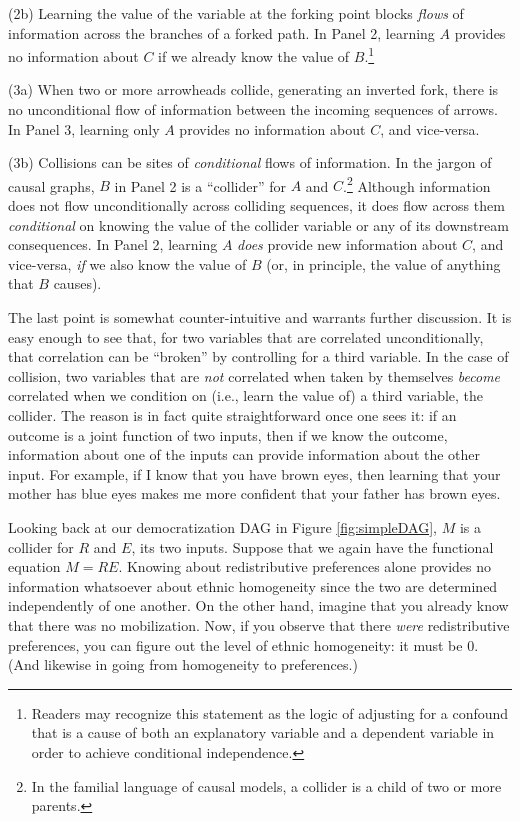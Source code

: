 \documentclass[
  12pt,
]{book}
\begin{document}
(2b) Learning the value of the variable at the forking point blocks \emph{flows} of information across the branches of a forked path. In Panel 2, learning \(A\) provides no information about \(C\) if we already know the value of \(B\).\footnote{Readers may recognize this statement as the logic of adjusting for a confound that is a cause of both an explanatory variable and a dependent variable in order to achieve conditional independence.}

(3a) When two or more arrowheads collide, generating an inverted fork, there is no unconditional flow of information between the incoming sequences of arrows. In Panel 3, learning only \(A\) provides no information about \(C\), and vice-versa.

(3b) Collisions can be sites of \emph{conditional} flows of information. In the jargon of causal graphs, \(B\) in Panel 2 is a ``collider'' for \(A\) and \(C\).\footnote{In the familial language of causal models, a collider is a child of two or more parents.} Although information does not flow unconditionally across colliding sequences, it does flow across them \emph{conditional} on knowing the value of the collider variable or any of its downstream consequences. In Panel 2, learning \(A\) \emph{does} provide new information about \(C\), and vice-versa, \emph{if} we also know the value of \(B\) (or, in principle, the value of anything that \(B\) causes).

The last point is somewhat counter-intuitive and warrants further discussion. It is easy enough to see that, for two variables that are correlated unconditionally, that correlation can be ``broken'' by controlling for a third variable. In the case of collision, two variables that are \emph{not} correlated when taken by themselves \emph{become} correlated when we condition on (i.e., learn the value of) a third variable, the collider. The reason is in fact quite straightforward once one sees it: if an outcome is a joint function of two inputs, then if we know the outcome, information about one of the inputs can provide information about the other input. For example, if I know that you have brown eyes, then learning that your mother has blue eyes makes me more confident that your father has brown eyes.

Looking back at our democratization DAG in Figure \ref{fig:simpleDAG}, \(M\) is a collider for \(R\) and \(E\), its two inputs. Suppose that we again have the functional equation \(M=RE\). Knowing about redistributive preferences alone provides no information whatsoever about ethnic homogeneity since the two are determined independently of one another. On the other hand, imagine that you already know that there was no mobilization. Now, if you observe that there \emph{were} redistributive preferences, you can figure out the level of ethnic homogeneity: it must be 0. (And likewise in going from homogeneity to preferences.)
\end{document}

